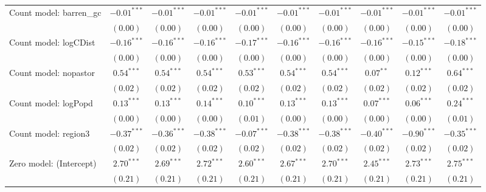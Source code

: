 \begin{center}
\begin{longtable}{l c c c c c c c c c}
Count model: barren\_gc        & $-0.01^{***}$ & $-0.01^{***}$ & $-0.01^{***}$ & $-0.01^{***}$   & $-0.01^{***}$ & $-0.01^{***}$   & $-0.01^{***}$   & $-0.01^{***}$ & $-0.01^{***}$ \\
                               & $(0.00)$      & $(0.00)$      & $(0.00)$      & $(0.00)$        & $(0.00)$      & $(0.00)$        & $(0.00)$        & $(0.00)$      & $(0.00)$      \\
Count model: logCDist          & $-0.16^{***}$ & $-0.16^{***}$ & $-0.16^{***}$ & $-0.17^{***}$   & $-0.16^{***}$ & $-0.16^{***}$   & $-0.16^{***}$   & $-0.15^{***}$ & $-0.18^{***}$ \\
                               & $(0.00)$      & $(0.00)$      & $(0.00)$      & $(0.00)$        & $(0.00)$      & $(0.00)$        & $(0.00)$        & $(0.00)$      & $(0.00)$      \\
Count model: nopastor          & $0.54^{***}$  & $0.54^{***}$  & $0.54^{***}$  & $0.53^{***}$    & $0.54^{***}$  & $0.54^{***}$    & $0.07^{**}$     & $0.12^{***}$  & $0.64^{***}$  \\
                               & $(0.02)$      & $(0.02)$      & $(0.02)$      & $(0.02)$        & $(0.02)$      & $(0.02)$        & $(0.02)$        & $(0.02)$      & $(0.02)$      \\
Count model: logPopd           & $0.13^{***}$  & $0.13^{***}$  & $0.14^{***}$  & $0.10^{***}$    & $0.13^{***}$  & $0.13^{***}$    & $0.07^{***}$    & $0.06^{***}$  & $0.24^{***}$  \\
                               & $(0.00)$      & $(0.00)$      & $(0.00)$      & $(0.01)$        & $(0.00)$      & $(0.00)$        & $(0.00)$        & $(0.00)$      & $(0.01)$      \\
Count model: region3           & $-0.37^{***}$ & $-0.36^{***}$ & $-0.38^{***}$ & $-0.07^{***}$   & $-0.38^{***}$ & $-0.38^{***}$   & $-0.40^{***}$   & $-0.90^{***}$ & $-0.35^{***}$ \\
                               & $(0.02)$      & $(0.02)$      & $(0.02)$      & $(0.02)$        & $(0.02)$      & $(0.02)$        & $(0.02)$        & $(0.02)$      & $(0.02)$      \\
Zero model: (Intercept)        & $2.70^{***}$  & $2.69^{***}$  & $2.72^{***}$  & $2.60^{***}$    & $2.67^{***}$  & $2.70^{***}$    & $2.45^{***}$    & $2.73^{***}$  & $2.75^{***}$  \\
                               & $(0.21)$      & $(0.21)$      & $(0.21)$      & $(0.21)$        & $(0.21)$      & $(0.21)$        & $(0.21)$        & $(0.21)$      & $(0.21)$      \\

\end{longtable}
\end{center}
